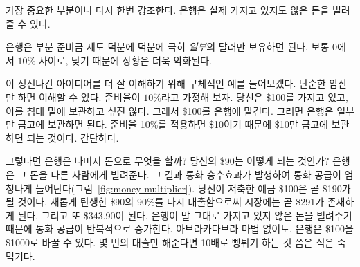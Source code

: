 \begin{comment}
	Let me repeat the most important part: banks can lend money that they
	don't actually have.
\end{comment}
가장 중요한 부분이니 다시 한번 강조한다.
은행은 실제 가지고 있지도 않은 돈을 빌려줄 수 있다.

\begin{comment}
	Thanks to fractional reserve banking, a bank only has to keep a small
	\textit{fraction} of every dollar it gets. It's somewhere between $0$ and $10\%$,
	usually at the lower end, which makes things even worse.
\end{comment}
은행은 부분 준비금 제도 덕분에 덕분에 극히 \textit{일부}의 달러만 보유하면 된다. 
보통 $0$에서 $10\%$ 사이로, 낮기 때문에 상황은 더욱 악화된다.

\begin{comment}
	Let's use a concrete example to better understand this crazy idea: A
	fraction of $10\%$ will do the trick and we should be able to do all the
	calculations in our head. Win-win. So, if you take \$100 to a
	bank --- because you don't want to store it under your mattress --- they
	only have to keep the agreed upon \textit{fraction} of it. In our example that
	would be \$10, because 10\% of \$100 is \$10. Easy, right?
\end{comment}
이 정신나간 아이디어를 더 잘 이해하기 위해 구체적인 예를 들어보겠다. 
단순한 암산만 하면 이해할 수 있다. 준비율이 $10\%$라고 가정해 보자.
당신은 \$100를 가지고 있고, 이를 침대 밑에 보관하고 싶진 않다.
그래서 \$100를 은행에 맡긴다. 그러면 은행은 일부만 금고에 보관하면 된다.
준비율 10\%를 적용하면 \$10이기 때문에 \$10만 금고에 보관하면 되는 것이다.  
간단하다.

\begin{comment}
	So what do banks do with the rest of the money? What happens to your \$90? They
	do what banks do, they lend it to other people. The result is a money multiplier
	effect, which increases the money supply in the economy enormously
	(Figure~\ref{fig:money-multiplier}). Your initial deposit of \$100 will soon
	turn into \$190. By lending a 90\% fraction of the newly created \$90, there
	will soon be \$271 in the economy. And \$343.90 after that. The money supply is
	recursively increasing, since banks are literally lending money they don't
	have~\cite{wiki:money-multiplier}. Without a single Abracadabra, banks magically
	transform \$100 into one thousand dollars or more. Turns out 10x is easy. It
	only takes a couple of lending rounds.
\end{comment}
그렇다면 은행은 나머지 돈으로 무엇을 할까? 
당신의 \$90는 어떻게 되는 것인가? 
은행은 그 돈을 다른 사람에게 빌려준다. 
그 결과 통화 승수효과가 발생하여 통화 공급이 엄청나게 늘어난다(그림~\ref{fig:money-multiplier}). 
당신이 저축한 예금 \$100은 곧 \$190가 될 것이다. 
새롭게 탄생한 \$90의 90\%를 다시 대출함으로써 시장에는 곧 \$291가 존재하게 된다. 
그리고 또 \$343.90이 된다. 
은행이 말 그대로 가지고 있지 않은 돈을 빌려주기 때문에 통화 공급이 반복적으로 증가한다\cite{wiki:money-multiplier}. 
아브라카다브라 마법 없이도, 은행은 \$100을 \$1000로 바꿀 수 있다. 
몇 번의 대출만 해준다면 10배로 뻥튀기 하는 것 쯤은 식은 죽 먹기다.

